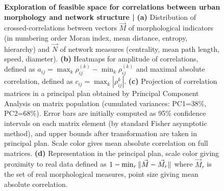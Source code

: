 \begin{figure}
{}
\subfloat[]{%
\vspace{-8.3cm}
}

\caption[Exploration of feasible space for correlations between urban morphology and network structure]{\footnotesize\textbf{Exploration of feasible space for correlations between urban morphology and network structure | } \textbf{(a)} Distribution of crossed-correlations between vectors $\vec{M}$ of morphological indicators (in numbering order Moran index, mean distance, entropy, hierarchy) and $\vec{N}$ of network measures (centrality, mean path length, speed, diameter). \textbf{(b)} Heatmaps for amplitude of correlations, defined as $a_{ij}=\max_k{\rho_{ij}^{(k)}}-\min_k{\rho_{ij}^{(k)}}$ and maximal absolute correlation, defined as $c_{ij}=\max_k\left| \rho_{ij}^{k} \right|$. \textbf{(c)} Projection of correlation matrices in a principal plan obtained by Principal Component Analysis on matrix population (cumulated variances: PC1=38\%, PC2=68\%). Error bars are initially computed as 95\% confidence intervals on each matrix element (by standard Fisher asymptotic method), and upper bounds after transformation are taken in principal plan. Scale color gives mean absolute correlation on full matrices. \textbf{(d)} Representation in the principal plan, scale color giving proximity to real data defined as $1 - \min_r \| \vec{M}-\vec{M}_r \|$ where $\vec{M}_r$ is the set of real morphological measures, point size giving mean absolute correlation.}
\label{fig:densnwcor}
\end{figure}


